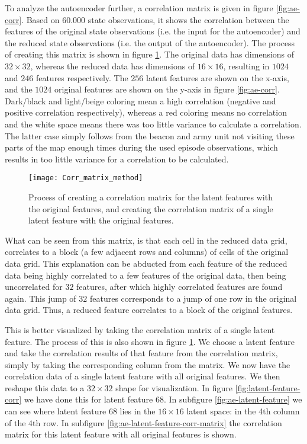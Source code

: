 To analyze the autoencoder further, a correlation matrix is given in figure \ref{fig:ae-corr}. Based on $60.000$ state observations, it shows the correlation between the features of the original state observations (i.e. the input for the autoencoder) and the reduced state observations (i.e. the output of the autoencoder). The process of creating this matrix is shown in figure \ref{fig:ae-corr-process}. The original data has dimensions of $32 \times 32$, whereas the reduced data has dimensions of $16 \times 16$, resulting in $1024$ and $246$ features respectively. The $256$ latent features are shown on the x-axis, and the $1024$ original features are shown on the y-axis in figure \ref{fig:ae-corr}. Dark/black and light/beige coloring mean a high correlation (negative and positive correlation respectively), whereas a red coloring means no correlation and the white space means there was too little variance to calculate a correlation. The latter case simply follows from the beacon and army unit not visiting these parts of the map enough times during the used episode observations, which results in too little variance for a correlation to be calculated.

\begin{figure}[h]
	\centering
	\texttt{[image: Corr\_matrix\_method]}
	\caption{Process of creating a correlation matrix for the latent features with the original features, and creating the correlation matrix of a single latent feature with the original features.}
	\label{fig:ae-corr-process}
\end{figure}

What can be seen from this matrix, is that each cell in the reduced data grid, correlates to a block (a few adjacent rows and columns) of cells of the original data grid. This explanation can be abducted from each feature of the reduced data being highly correlated to a few features of the original data, then being uncorrelated for $32$ features, after which highly correlated features are found again. This jump of $32$ features corresponds to a jump of one row in the original data grid. Thus, a reduced feature correlates to a block of the original features.

This is better visualized by taking the correlation matrix of a single latent feature. The process of this is also shown in figure \ref{fig:ae-corr-process}. We choose a latent feature and take the correlation results of that feature from the correlation matrix, simply by taking the corresponding column from the matrix. We now have the correlation data of a single latent feature with all original features. We then reshape this data to a $32 \times 32$ shape for visualization. In figure \ref{fig:latent-feature-corr} we have done this for latent feature $68$. In subfigure \ref{fig:ae-latent-feature} we can see where latent feature $68$ lies in the $16 \times 16$ latent space: in the 4th column of the 4th row. In subfigure \ref{fig:ae-latent-feature-corr-matrix} the correlation matrix for this latent feature with all original features is shown.

